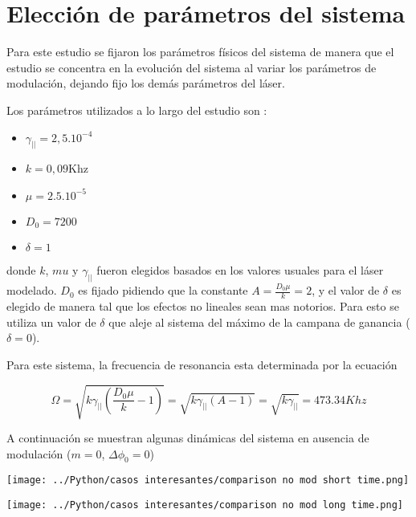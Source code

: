 
\section{Elección de parámetros del sistema}

	Para este estudio se fijaron los parámetros físicos del sistema de manera que el estudio se concentra en la evolución del sistema al variar los parámetros de modulación, dejando fijo los demás parámetros del láser.
	
	Los parámetros utilizados a lo largo del estudio son :
	\begin{itemize}
		\item $\gamma_{||}=2,5 .10^{-4}$
		\item $k=0,09$Khz
		\item $\mu=2.5 .10^{-5}$
		\item $D_0=7200$
		\item $\delta=1$
	\end{itemize}
	
	donde $k$, $mu$ y  $\gamma_{||}$ fueron elegidos basados en los valores usuales para el láser modelado.
	$D_0$ es fijado pidiendo que la constante $A=\frac{D_0 \mu}{k}=2$, y el valor de $\delta$ es elegido de manera tal que los efectos no lineales sean mas notorios. Para esto se utiliza un valor de $\delta$ que aleje al sistema del máximo de la campana de ganancia ($\delta=0$).
	
	Para este sistema, la frecuencia de resonancia esta determinada por la ecuación 
	
	\[ \Omega=\sqrt{k \gamma_{||} (\frac{D_0 \mu}{k} -1)}=\sqrt{k \gamma_{||} (A -1)}=\sqrt{k \gamma_{||}}=473.34 Khz\]
	
	A continuación se muestran algunas dinámicas del sistema en ausencia de modulación ($m=0$, $\Delta \phi_0 = 0$)
	
%		
%		
%		
	\begin{minipage}{0.5\textwidth}
		\begin{center}
			\texttt{[image: ../Python/casos interesantes/comparison no mod short time.png]}
		\end{center}
	\end{minipage}
	\begin{minipage}{0.5\textwidth}
		\begin{center}
			\texttt{[image: ../Python/casos interesantes/comparison no mod long time.png]}
		\end{center}
	\end{minipage}
	
